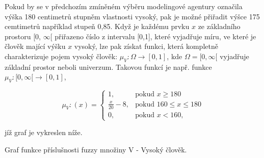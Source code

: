     Pokud by se v předchozím zmíněném výběru modelingové agentury označila výška 180 centimetr\r u stupněm vlastnosti \clqq vysoký\crqq {}, pak je možné přiřadit výšce 175 cemtimetr\r u například stupe\v n 0,85. Když je každému prvku $x$ ze základního prostoru [0, $\infty$[ přiřazeno číslo z intervalu [0,1], které vyjadřuje míru, ve které je člověk mající výšku $x$ vysoký, lze pak získat funkci, která kompletně charakterizuje pojem vysoký člověk: $\mu_V: \Omega \rightarrow [0,1]$, kde $\Omega = [0, \infty[$ vyjadřuje základní prostor neboli univerzum. Takovou funkcí je např. funkce $\mu_V:  [0, \infty[ \rightarrow [0,1]$, 

    $$\mu_V:(x)=\begin{cases} 1, & \mbox{pokud }  x \geq 180\\ 
    \frac{x}{20} - 8, & \mbox{pokud } 160 \leq x \leq 180\\
    0, & \mbox{pokud } x < 160,  \end{cases}$$

    jíž graf je vykreslen níže.

    \begin{graph} Graf funkce příslušnosti fuzzy množiny V - \clqq Vysoký člověk\crqq.\\
    \end{graph}



